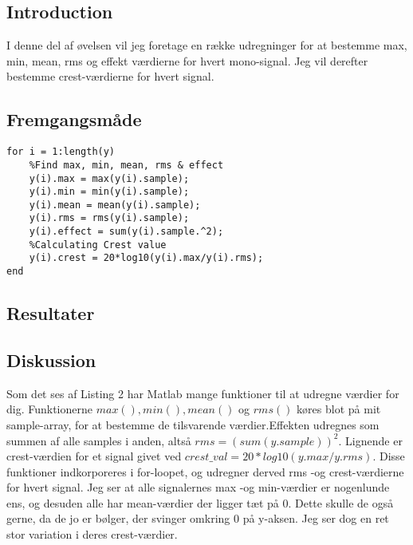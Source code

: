 \documentclass[../main.tex]{subfiles}
\begin{document}
\subsection{Introduction}

I denne del af øvelsen vil jeg foretage en række udregninger for at bestemme max, min, mean, rms og effekt værdierne for hvert mono-signal. Jeg vil derefter bestemme crest-værdierne for hvert signal.

\subsection{Fremgangsmåde}

\begin{lstlisting}[caption={Matlab kode for øvelse 3 \& 4}, label={lst:myLSTdsadsa}]
for i = 1:length(y)
    %Find max, min, mean, rms & effect
    y(i).max = max(y(i).sample);
    y(i).min = min(y(i).sample);
    y(i).mean = mean(y(i).sample);
    y(i).rms = rms(y(i).sample);
    y(i).effect = sum(y(i).sample.^2);
    %Calculating Crest value
    y(i).crest = 20*log10(y(i).max/y(i).rms);
end
\end{lstlisting}

\subsection{Resultater}




\subsection{Diskussion}

Som det ses af Listing 2 har Matlab mange funktioner til at udregne værdier for dig. Funktionerne $max(), min(), mean()$ og $rms()$ køres blot på mit sample-array, for at bestemme de tilsvarende værdier.Effekten udregnes som summen af alle samples i anden, altså $rms = (sum(y.sample))^2$. Lignende er crest-værdien for et signal givet ved $crest\_val = 20*log10(y.max/y.rms)$. Disse funktioner indkorporeres i for-loopet, og udregner derved rms -og crest-værdierne for hvert signal.\vspace{0.5cm}
Jeg ser at alle signalernes max -og min-værdier er nogenlunde ens, og desuden alle har mean-værdier der ligger tæt på 0. Dette skulle de også gerne, da de jo er bølger, der svinger omkring 0 på y-aksen. Jeg ser dog en ret stor variation i deres crest-værdier. \vspace{0.5cm}
\end{document}
